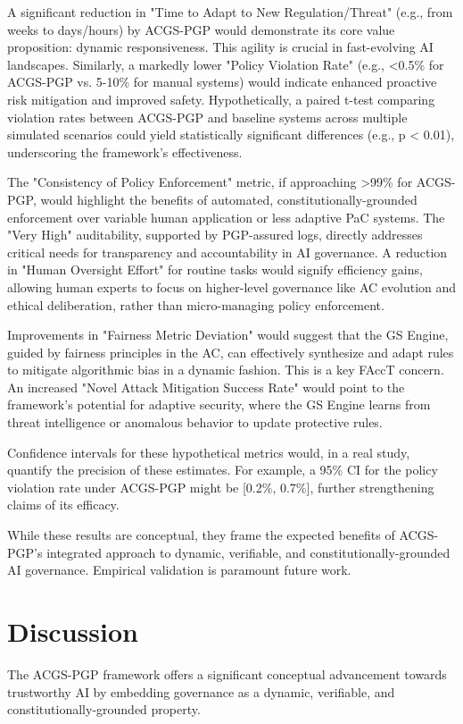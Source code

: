 \documentclass[sigconf,review,anonymous=false]{acmart} %
\begin{document}
A significant reduction in "Time to Adapt to New Regulation/Threat" (e.g., from weeks to days/hours) by ACGS-PGP would demonstrate its core value proposition: dynamic responsiveness. This agility is crucial in fast-evolving AI landscapes. Similarly, a markedly lower "Policy Violation Rate" (e.g., <0.5\% for ACGS-PGP vs. 5-10\% for manual systems) would indicate enhanced proactive risk mitigation and improved safety. Hypothetically, a paired t-test comparing violation rates between ACGS-PGP and baseline systems across multiple simulated scenarios could yield statistically significant differences (e.g., p < 0.01), underscoring the framework's effectiveness.

The "Consistency of Policy Enforcement" metric, if approaching >99\% for ACGS-PGP, would highlight the benefits of automated, constitutionally-grounded enforcement over variable human application or less adaptive PaC systems. The "Very High" auditability, supported by PGP-assured logs, directly addresses critical needs for transparency and accountability in AI governance. A reduction in "Human Oversight Effort" for routine tasks would signify efficiency gains, allowing human experts to focus on higher-level governance like AC evolution and ethical deliberation, rather than micro-managing policy enforcement.

Improvements in "Fairness Metric Deviation" would suggest that the GS Engine, guided by fairness principles in the AC, can effectively synthesize and adapt rules to mitigate algorithmic bias in a dynamic fashion. This is a key FAccT concern. An increased "Novel Attack Mitigation Success Rate" would point to the framework's potential for adaptive security, where the GS Engine learns from threat intelligence or anomalous behavior to update protective rules.

Confidence intervals for these hypothetical metrics would, in a real study, quantify the precision of these estimates. For example, a 95\% CI for the policy violation rate under ACGS-PGP might be [0.2\%, 0.7\%], further strengthening claims of its efficacy.

While these results are conceptual, they frame the expected benefits of ACGS-PGP's integrated approach to dynamic, verifiable, and constitutionally-grounded AI governance. Empirical validation is paramount future work.

\section{Discussion}
\label{sec:discussion}
The ACGS-PGP framework offers a significant conceptual advancement towards trustworthy AI by embedding governance as a dynamic, verifiable, and constitutionally-grounded property.
\end{document}

